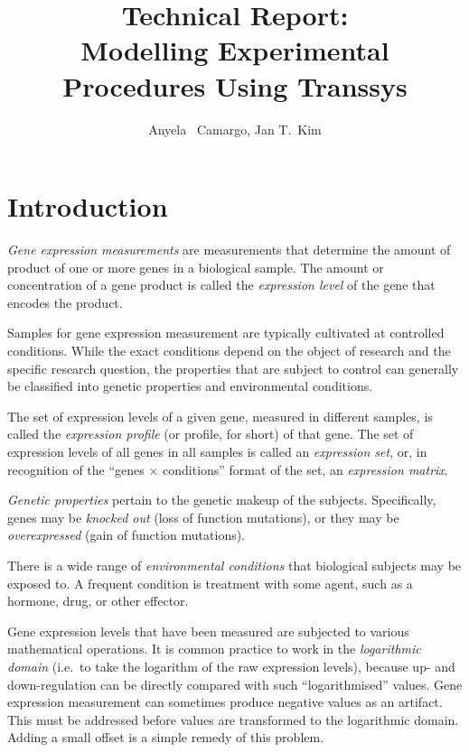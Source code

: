 \documentclass[a4paper,fleqn]{article}
\newcommand{\newterm}[1]{\emph{#1}}
\begin{document}
\title{Technical Report: \\
  Modelling Experimental Procedures Using Transsys}
\author{Anyela \ Camargo, Jan T.\ Kim}
\maketitle

\section{Introduction}

\newterm{Gene expression measurements} are measurements that determine
the amount of product of one or more genes in a biological sample. The
amount or concentration of a gene product is called the
\newterm{expression level} of the gene that encodes the product.

Samples for gene expression measurement are typically cultivated at
controlled conditions. While the exact conditions depend on the object
of research and the specific research question, the properties that
are subject to control can generally be classified into genetic
properties and environmental conditions.

The set of expression levels of a given gene, measured in different
samples, is called the \newterm{expression profile} (or profile, for
short) of that gene. The set of expression levels of all genes in all
samples is called an \newterm{expression set}, or, in recognition of
the ``genes $\times$ conditions'' format of the set, an
\newterm{expression matrix}.

\newterm{Genetic properties} pertain to the genetic makeup of the
subjects.  Specifically, genes may be \newterm{knocked out} (loss of
function mutations), or they may be \newterm{overexpressed} (gain of
function mutations).

There is a wide range of \newterm{environmental conditions} that
biological subjects may be exposed to. A frequent condition is
treatment with some agent, such as a hormone, drug, or other effector.

Gene expression levels that have been measured are subjected to
various mathematical operations. It is common practice to work in the
\newterm{logarithmic domain} (i.e.\ to take the logarithm of the raw
expression levels), because up- and down-regulation can be directly
compared with such ``logarithmised'' values. Gene expression
measurement can sometimes produce negative values as an artifact. This
must be addressed before values are transformed to the logarithmic
domain. Adding a small offset is a simple remedy of this problem.
\end{document}
